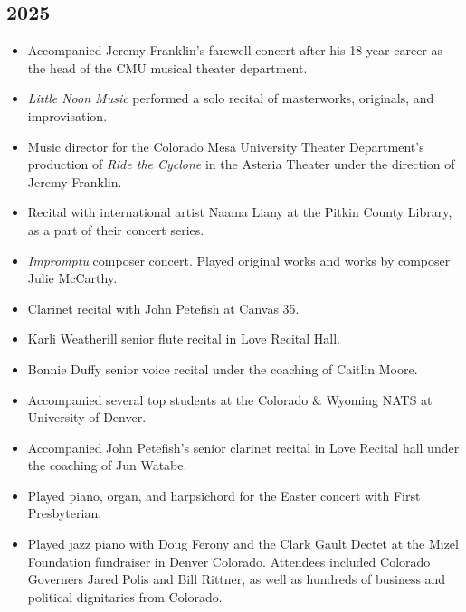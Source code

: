 \documentclass{article}
\newcommand{\cvItem}[1]{
        \item {
            {#1}
        }
    }
\newcommand{\cvItemListStart}{\begin{itemize}[leftmargin=10pt]}
\newcommand{\cvItemListEnd}{\end{itemize}}
\begin{document}
        \subsection{2025}
            \cvItemListStart
                \cvItem{Accompanied Jeremy Franklin's farewell concert after his 18 year career as
                the head of the CMU musical theater department.}
                \cvItem{{\em Little Noon Music} performed a solo recital of masterworks, originals,
                and improvisation.}
                \cvItem{Music director for the Colorado Mesa University Theater Department's
                production of {\em Ride the Cyclone} in the Asteria Theater under the direction of
                Jeremy Franklin.}
                \cvItem{Recital with international artist Naama Liany at the Pitkin County Library,
                as a part of their concert series.}
                \cvItem{{\em Impromptu} composer concert. Played original works and works by
                composer Julie McCarthy.}
                \cvItem{Clarinet recital with John Petefish at Canvas 35.}
                \cvItem{Karli Weatherill senior flute recital in Love Recital Hall.}
                \cvItem{Bonnie Duffy senior voice recital under the coaching of Caitlin Moore.}
                \cvItem{Accompanied several top students at the Colorado \& Wyoming NATS at
                University of Denver.}
                \cvItem{Accompanied John Petefish's senior clarinet recital in Love Recital hall
                under the coaching of Jun Watabe.}
                \cvItem{Played piano, organ, and harpsichord for the Easter concert with First
                Presbyterian.}
                \cvItem{Played jazz piano with Doug Ferony and the Clark Gault Dectet at the
                Mizel Foundation fundraiser in Denver Colorado. Attendees included Colorado
                Governers Jared Polis and Bill Rittner, as well as hundreds of business and political
                dignitaries from Colorado.}
            \cvItemListEnd
\end{document}
